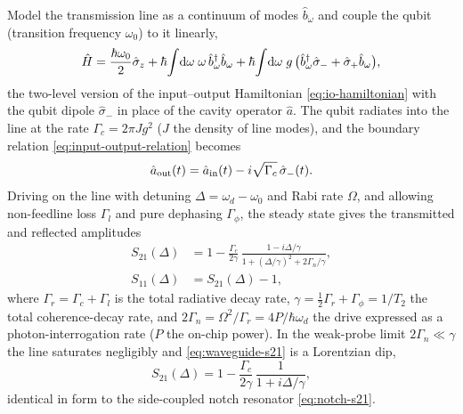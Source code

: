 \begin{statement}
\label{stmt:waveguide-readout}
Model the transmission line as a continuum of modes $\hat b_\omega$ and
couple the qubit (transition frequency $\omega_0$) to it linearly,
\begin{equation}
\label{eq:waveguide-hamiltonian}
\hat{H} = \frac{\hbar\omega_0}{2}\hat\sigma_z
 + \hbar\!\int\!\dd\omega\;\omega\,\hat b_\omega^\dagger\hat b_\omega
 + \hbar\!\int\!\dd\omega\;g\,\bigl(\hat b_\omega^\dagger\hat\sigma_- + \hat\sigma_+\hat b_\omega\bigr),
\end{equation}
the two-level version of the input--output Hamiltonian
\cref{eq:io-hamiltonian} with the qubit dipole $\hat\sigma_-$ in place
of the cavity operator $\hat a$. The qubit radiates into the line at
the rate $\Gamma_c=2\pi J g^2$ ($J$ the density of line modes), and the
boundary relation \cref{eq:input-output-relation} becomes
\begin{equation}
\label{eq:waveguide-io}
\hat a_{\rm out}(t)=\hat a_{\rm in}(t) - i\sqrt{\Gamma_c}\,\hat\sigma_-(t).
\end{equation}
Driving on the line with detuning $\Delta=\omega_d-\omega_0$ and Rabi
rate $\Omega$, and allowing non-feedline loss $\Gamma_l$ and pure
dephasing $\Gamma_\phi$, the steady state gives the transmitted and
reflected amplitudes
\begin{align}
\label{eq:waveguide-s21}
S_{21}(\Delta) &= 1 - \frac{\Gamma_c}{2\gamma}\,
   \frac{1 - i\Delta/\gamma}{1+(\Delta/\gamma)^2 + 2\Gamma_n/\gamma},\\
\label{eq:waveguide-s11}
S_{11}(\Delta) &= S_{21}(\Delta)-1,
\end{align}
where $\Gamma_r=\Gamma_c+\Gamma_l$ is the total radiative decay rate,
$\gamma=\tfrac12\Gamma_r+\Gamma_\phi=1/T_2$ the total
coherence-decay rate, and $2\Gamma_n=\Omega^2/\Gamma_r=4P/\hbar\omega_d$
the drive expressed as a photon-interrogation rate ($P$ the on-chip
power). In the weak-probe limit $2\Gamma_n\ll\gamma$ the line saturates
negligibly and \cref{eq:waveguide-s21} is a Lorentzian dip,
\begin{equation}
\label{eq:waveguide-weak}
S_{21}(\Delta)=1-\frac{\Gamma_c}{2\gamma}\,\frac{1}{1+i\Delta/\gamma},
\end{equation}
identical in form to the side-coupled notch resonator
\cref{eq:notch-s21}.
\end{statement}

